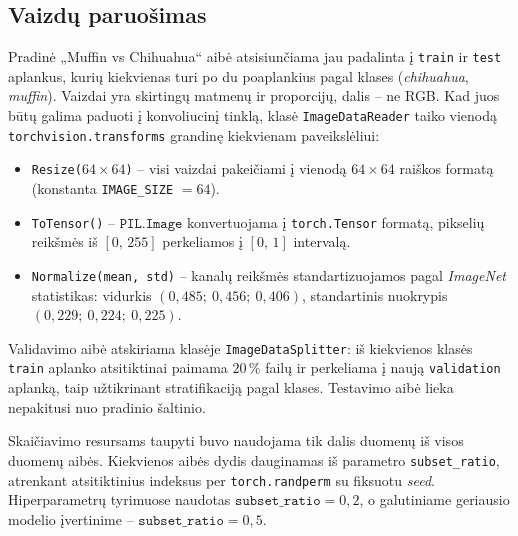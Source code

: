 \subsection{Vaizdų paruošimas}
\label{subsec:vaizdu_paruosimas}

Pradinė „Muffin vs Chihuahua“ aibė atsisiunčiama jau padalinta į \texttt{train} ir \texttt{test} aplankus, kurių kiekvienas turi po du poaplankius pagal klases (\textit{chihuahua}, \textit{muffin}). Vaizdai yra skirtingų matmenų ir proporcijų, dalis – ne RGB. Kad juos būtų galima paduoti į konvoliucinį tinklą, klasė \texttt{ImageDataReader} taiko vienodą \texttt{torchvision.transforms} grandinę kiekvienam paveikslėliui:
\begin{itemize}
    \item \texttt{Resize($64 \times 64$)} – visi vaizdai pakeičiami į vienodą $64 \times 64$ raiškos formatą (konstanta \texttt{IMAGE\_SIZE} $= 64$).
    \item \texttt{ToTensor()} – $\texttt{PIL.Image}$ konvertuojama į \texttt{torch.Tensor} formatą, pikselių reikšmės iš $[0,\,255]$ perkeliamos į $[0,\,1]$ intervalą.
    \item \texttt{Normalize(mean, std)} – kanalų reikšmės standartizuojamos pagal \textit{ImageNet} statistikas: vidurkis $(0{,}485;\ 0{,}456;\ 0{,}406)$, standartinis nuokrypis $(0{,}229;\ 0{,}224;\ 0{,}225)$.
\end{itemize}

Validavimo aibė atskiriama klasėje \texttt{ImageDataSplitter}: iš kiekvienos klasės \texttt{train} aplanko atsitiktinai paimama $20\,\%$ failų ir perkeliama į naują \texttt{validation} aplanką, taip užtikrinant stratifikaciją pagal klases. Testavimo aibė lieka nepakitusi nuo pradinio šaltinio.

Skaičiavimo resursams taupyti buvo naudojama tik dalis duomenų iš visos duomenų aibės. Kiekvienos aibės dydis dauginamas iš parametro \texttt{subset\_ratio}, atrenkant atsitiktinius indeksus per \texttt{torch.randperm} su fiksuotu \textit{seed}. Hiperparametrų tyrimuose naudotas $\texttt{subset\_ratio} = 0{,}2$, o galutiniame geriausio modelio įvertinime – $\texttt{subset\_ratio} = 0{,}5$.
